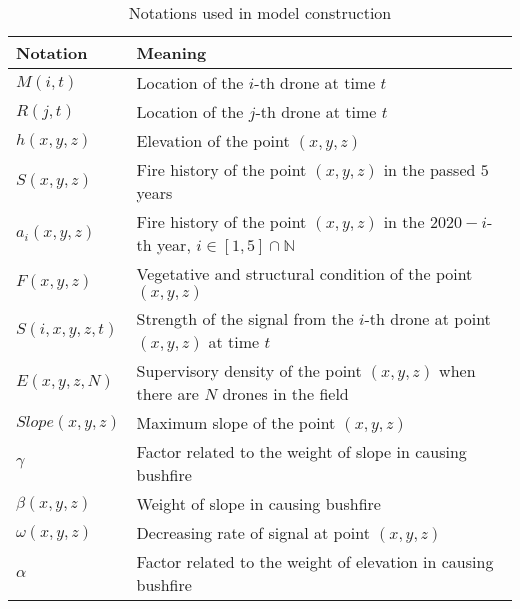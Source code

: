 \documentclass[13pt]{ctexart} %
\begin{document}
\begin{table}[h]
    \centering
    \caption{Notations used in model construction}
    \vspace{3pt}
    \begin{tabular}{>{\centering\arraybackslash}p{6em}>{\centering\arraybackslash}p{30em}}
        \toprule %
        Notation         & Meaning                                 \\
        \midrule %
        $M
        (i,t)$           & Location of the $i$-th drone
        \uppercase\expandafter{\romannumeral1} at time $t$         \\
        $R
        (j,t)$           & Location of the $j$-th drone
        \uppercase\expandafter{\romannumeral2} at time $t$         \\
        $h
        (x,y,z)$         & Elevation of the point $(x,y,z)$        \\
        $S
        (x,y,z)$         & Fire history of the point $(x,y,z)$
        in the passed $5$ years                                    \\
        $a_i
        (x,y,z)$         & Fire history of the point $(x,y,z)$
        in the $2020-i$-th year,
        $i\in [1,5] \cap \mathbb{N} $                              \\
        $F(x,y,z) $      & Vegetative and structural
        condition of the point$(x,y,z)$                            \\
        $S(i,x,y,z,t)$   & Strength of the signal from the
        $i$-th drone at point $(x,y,z)$ at time $t$                \\
        $E
        (x,y,z,N)$       & Supervisory density of
        the point $(x,y,z)$ when there are $N$ drones in the field \\
        $Slope
        (x,y,z)$         & Maximum slope of the point $(x,y,z)$    \\
        $\gamma$         & Factor related to the weight
        of slope in causing bushfire                               \\
        $\beta
        (x,y,z)$         & Weight of slope in causing bushfire     \\
        $\omega
        (x,y,z)$         & Decreasing rate of signal
        at point $(x,y,z)$                                         \\
        $\alpha$         & Factor related to the weight
        of elevation in causing bushfire                           \\

\end{tabular}
\end{table}
\end{document}

